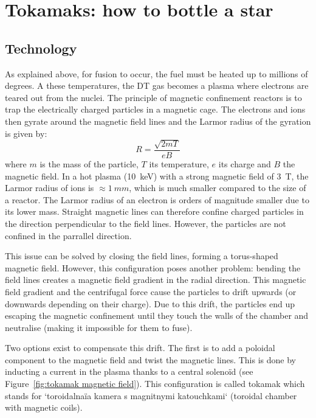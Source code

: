 
\section{Tokamaks: how to bottle a star}

\subsection{Technology \cite{mccracken_fusion_2013}}
As explained above, for fusion to occur, the fuel must be heated up to millions of degrees.
A these temperatures, the DT gas becomes a \gls{plasma} where electrons are teared out from the nuclei.
The principle of magnetic confinement reactors is to trap the electrically charged particles in a magnetic cage.
The electrons and ions then gyrate around the magnetic field lines and the Larmor radius of the gyration is given by:
\begin{equation}
    R =  \frac{\sqrt{2 m T}}{e B}
\end{equation}
where $m$ is the mass of the particle, $T$ its temperature, $e$ its charge and $B$ the magnetic field.
In a hot \gls{plasma} (\SI{10}{keV}) with a strong magnetic field of \SI{3}{T}, the Larmor radius of ions is $\approx \SI{1}{mm}$, which is much smaller compared to the size of a reactor.
The Larmor radius of an electron is orders of magnitude smaller due to its lower mass.
Straight magnetic lines can therefore confine charged particles in the direction perpendicular to the field lines.
However, the particles are not confined in the parrallel direction.

This issue can be solved by closing the field lines, forming a torus-shaped magnetic field.
However, this configuration poses another problem: bending the field lines creates a magnetic field gradient in the radial direction.
This magnetic field gradient and the centrifugal force cause the particles to drift upwards (or downwards depending on their charge).
Due to this drift, the particles end up escaping the magnetic confinement until they touch the walls of the chamber and neutralise (making it impossible for them to fuse).

Two options exist to compensate this drift.
The first is to add a poloidal component to the magnetic field and twist the magnetic lines.
This is done by inducting a current in the \gls{plasma} thanks to a central solenoïd (see Figure~\ref{fig:tokamak magnetic field}).
This configuration is called \Gls{tokamak} which stands for `toroidalnaïa kamera s magnitnymi katouchkami` (toroidal chamber with magnetic coils).

